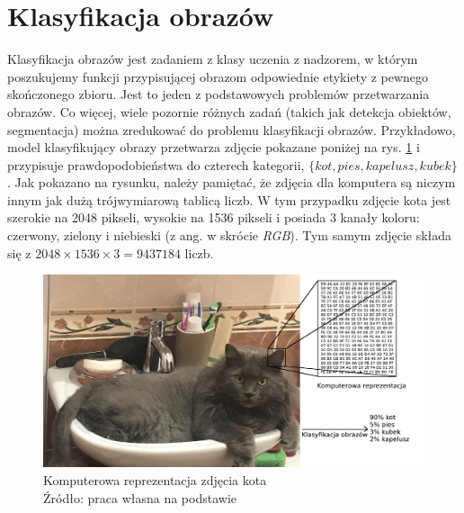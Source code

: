 \section{Klasyfikacja obrazów}
Klasyfikacja obrazów jest zadaniem z klasy uczenia z nadzorem, w którym poszukujemy funkcji przypisującej obrazom odpowiednie etykiety z pewnego skończonego zbioru.
Jest to jeden z podstawowych problemów przetwarzania obrazów.
Co więcej, wiele pozornie różnych zadań (takich jak detekcja obiektów, segmentacja) można zredukować do problemu klasyfikacji obrazów.
Przykładowo, model klasyfikujący obrazy przetwarza zdjęcie pokazane poniżej na rys. \ref{fig:image_classification} i przypisuje prawdopodobieństwa do czterech kategorii, $\lbrace kot, pies, kapelusz, kubek \rbrace$.
Jak pokazano na rysunku, należy pamiętać, że zdjęcia dla komputera są niczym innym jak dużą trójwymiarową tablicą liczb.
W tym przypadku zdjęcie kota jest szerokie na 2048 pikseli, wysokie na 1536 pikseli i posiada 3 kanały koloru: czerwony, zielony i niebieski (z ang. w skrócie \textit{RGB}).
Tym samym zdjęcie składa się z $2048 \times 1536 \times 3 = 9437184$ liczb.

\begin{figure}[h!tb]
	 \centering
	 \includegraphics[width = 1.0\linewidth]{img/kot}
	 \caption{Komputerowa reprezentacja zdjęcia kota \\
              Źródło: praca własna na podstawie \cite{cs231n}}
	 \label{fig:image_classification}
\end{figure}

